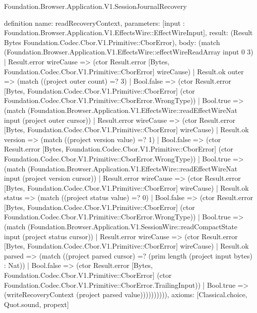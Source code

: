 \begin{lexlean}{Foundation.Browser.Application.V1.SessionJournalRecovery}
\begin{semanticmodule}
definition{
  name: readRecoveryContext,
  parameters: [input : Foundation.Browser.Application.V1.EffectsWire::EffectWireInput],
  result: (Result Bytes Foundation.Codec.Cbor.V1.Primitive::CborError),
  body: (match (Foundation.Browser.Application.V1.EffectsWire::effectWireReadArray input 0 3)
    | Result.error wireCause => (ctor Result.error [Bytes, Foundation.Codec.Cbor.V1.Primitive::CborError] wireCause)
    | Result.ok outer => (match ((project outer count) =? 3)
      | Bool.false => (ctor Result.error [Bytes, Foundation.Codec.Cbor.V1.Primitive::CborError] (ctor Foundation.Codec.Cbor.V1.Primitive::CborError.WrongType))
      | Bool.true => (match (Foundation.Browser.Application.V1.EffectsWire::readEffectWireNat input (project outer cursor))
        | Result.error wireCause => (ctor Result.error [Bytes, Foundation.Codec.Cbor.V1.Primitive::CborError] wireCause)
        | Result.ok version => (match ((project version value) =? 1)
          | Bool.false => (ctor Result.error [Bytes, Foundation.Codec.Cbor.V1.Primitive::CborError] (ctor Foundation.Codec.Cbor.V1.Primitive::CborError.WrongType))
          | Bool.true => (match (Foundation.Browser.Application.V1.EffectsWire::readEffectWireNat input (project version cursor))
            | Result.error wireCause => (ctor Result.error [Bytes, Foundation.Codec.Cbor.V1.Primitive::CborError] wireCause)
            | Result.ok status => (match ((project status value) =? 0)
              | Bool.false => (ctor Result.error [Bytes, Foundation.Codec.Cbor.V1.Primitive::CborError] (ctor Foundation.Codec.Cbor.V1.Primitive::CborError.WrongType))
              | Bool.true => (match (Foundation.Browser.Application.V1.SessionWire::readCompactState input (project status cursor))
                | Result.error wireCause => (ctor Result.error [Bytes, Foundation.Codec.Cbor.V1.Primitive::CborError] wireCause)
                | Result.ok parsed => (match ((project parsed cursor) =? (prim length (project input bytes) : Nat))
                  | Bool.false => (ctor Result.error [Bytes, Foundation.Codec.Cbor.V1.Primitive::CborError] (ctor Foundation.Codec.Cbor.V1.Primitive::CborError.TrailingInput))
                  | Bool.true => (writeRecoveryContext (project parsed value)))))))))),
  axioms: [Classical.choice, Quot.sound, propext]
}


\end{semanticmodule}
\end{lexlean}
